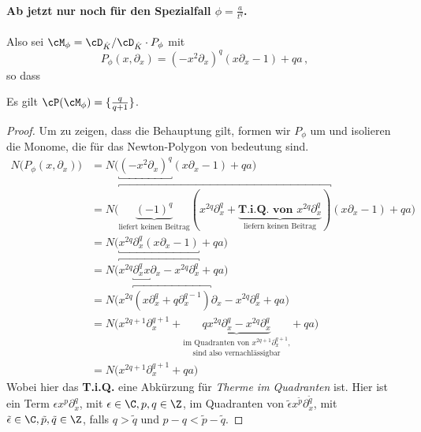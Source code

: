 \paragraph{Ab jetzt nur noch für den Spezialfall $\phi=\frac{a}{t^{q}}$.}
Also sei $\cM_\phi=\cD_{\hat K}/\cD_{\hat K}\cdot P_\phi$ mit
\[
P_{\phi}(x,\partial_x) =(-x^2\partial_x)^{q} (x\partial_x-1)+qa \,,
\]
so dass
\begin{lem}
Es gilt $\cP(\cM_{\phi})=\{\frac{q}{q+1}\}$.
\end{lem}
\begin{comment}
\begin{lem}
$N((x^2\partial_x)^q)=N(x^{2q}\partial_x^q)$
\end{lem}
\end{comment}
\begin{proof} \cite[5.b.]{sabbah_Fourier-local}
Um zu zeigen, dass die Behauptung gilt, formen wir $P_{\phi}$ um und isolieren
die Monome, die für das Newton-Polygon von bedeutung sind.
\begin{align*}
N\Big(P_{\phi}(x,\partial_x)\Big) &= N\Big(\underbracket{(-x^2\partial_x)^{q}}
  (x\partial_x-1)+qa\Big)
\\&= N\Big(\overbracket{\underset{\text{liefert keinen
Beitrag}}{\underbrace{(-1)^q}}(x^{2q}\partial_x^q
  + \underset{\text{liefern keinen Beitrag}}{
  \underbrace{\textbf{T.i.Q. von }x^{2q}\partial_x^q}})}
  (x\partial_x - 1) + qa \Big)
\\&= N\Big( \underbracket{x^{2q}\partial_x^q (x\partial_x - 1)} + qa \Big)
\\&= N\Big(\overbracket{x^{2q}\underbracket{\partial_x^q x}\partial_x
  - x^{2q}\partial_x^q} + qa \Big)
\\&= N\Big(x^{2q}\overbracket{(x\partial_x^q + q\partial_x^{q-1})}\partial_x
  - x^{2q}\partial_x^q + qa \Big)
\\&= N\Big(x^{2q + 1}\partial_x^{q + 1}
  + \underset{\text{sind also vernachlässigbar}}{
  \underset{\text{im Quadranten von $x^{2q + 1}\partial_x^{q + 1}$,}}{
  \underbrace{qx^{2q}\partial_x^{q} - x^{2q}\partial_x^q}}} + qa \Big)
\\&= N\Big(x^{2q + 1}\partial_x^{q + 1} + qa \Big)
\end{align*}
Wobei hier das \textbf{T.i.Q.} eine Abkürzung für \emph{Therme im Quadranten}
ist.
Hier ist ein Term $\epsilon x^{p}\partial_x^{q}$, mit $\epsilon\in \C, p,q
\in \Z$, im Quadranten von 
$\tilde\epsilon x^{\tilde p}\partial_x^{\tilde q}$, mit $\tilde\epsilon\in \C,
\tilde p,\tilde q \in \Z$, falls $q>\tilde q$ und $p-q<\tilde p - \tilde q$.

\end{proof}
